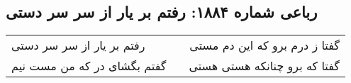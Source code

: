 \begin{center}
\section*{رباعی شماره ۱۸۸۴: رفتم بر یار از سر سر دستی}
\label{sec:1884}
\begin{longtable}{l p{0.5cm} r}
رفتم بر یار از سر سر دستی
&&
گفتا ز درم برو که این دم مستی
\\
گفتم بگشای در که من مست نیم
&&
گفتا که برو چنانکه هستی هستی
\\
\end{longtable}
\end{center}
